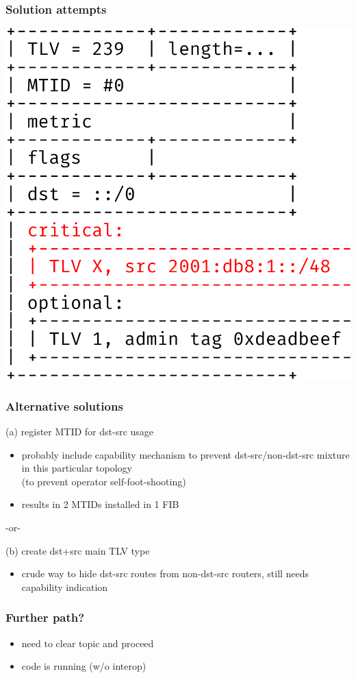 \documentclass[12pt]{beamer}
\begin{document}
\begin{frame}
  \frametitle{Solution attempts}
  \includegraphics[scale=0.45,angle=0]{isis_dstsrc_subtlv.pdf}%
\end{frame}

\begin{frame}
  \frametitle{Alternative solutions}
  (a) register MTID for dst-src usage
  \begin{itemize}
    \item probably include capability mechanism to prevent dst-src/non-dst-src
       mixture in this particular topology\\
       (to prevent operator self-foot-shooting)
    \item results in 2 MTIDs installed in 1 FIB
  \end{itemize}
  \begin{center}
    -or-\\[3mm]
  \end{center}
  (b) create dst+src main TLV type
  \begin{itemize}
    \item crude way to hide dst-src routes from non-dst-src routers, still
      needs capability indication
  \end{itemize}
\end{frame}

\begin{frame}
  \frametitle{Further path?}
  \begin{itemize}
    \item need to clear topic and proceed
    \item code is running (w/o interop)
  \end{itemize}
\end{frame}
\end{document}
